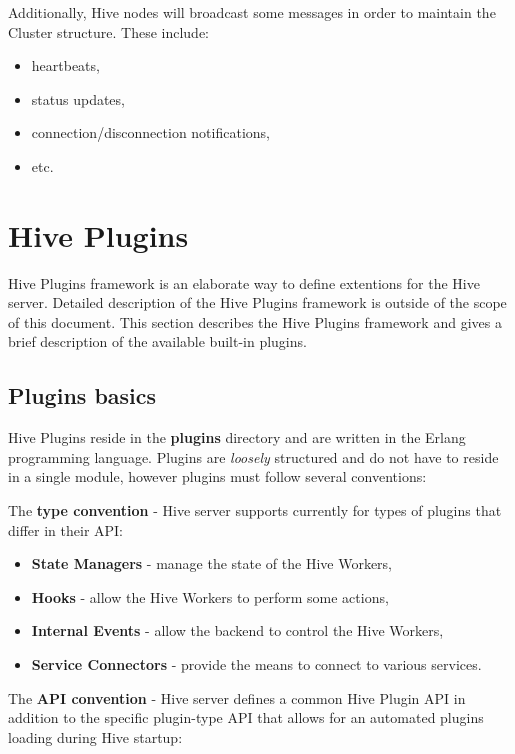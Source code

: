 \documentclass[a4paper]{article}
\begin{document}
Additionally, Hive nodes will broadcast some messages in order to maintain the Cluster structure. These include:


\begin{itemize}
\item heartbeats,
\item status updates,
\item connection/disconnection notifications,
\item etc.
\end{itemize}

\pagebreak
\section{Hive Plugins}
\label{sec-9}
\label{ref-plugins}

Hive Plugins framework is an elaborate way to define extentions for the Hive server. Detailed description of the Hive Plugins framework is outside of the scope of this document. This section describes the Hive Plugins framework and gives a brief description of the available built-in plugins.
\subsection{Plugins basics}
\label{sec-9-1}

Hive Plugins reside in the \textbf{plugins} directory and are written in the Erlang programming language. Plugins are \emph{loosely} structured and do not have to reside in a single module, however plugins must follow several conventions:

\noindent
The \textbf{type convention} - Hive server supports currently for types of plugins that differ in their API:


\begin{itemize}
\item \textbf{State Managers} - manage the state of the Hive Workers,
\item \textbf{Hooks} - allow the Hive Workers to perform some actions,
\item \textbf{Internal Events} - allow the backend to control the Hive Workers,
\item \textbf{Service Connectors} - provide the means to connect to various services.
\end{itemize}

\noindent
The \textbf{API convention} - Hive server defines a common Hive Plugin API in addition to the specific plugin-type API that allows for an automated plugins loading during Hive startup:
\end{document}
